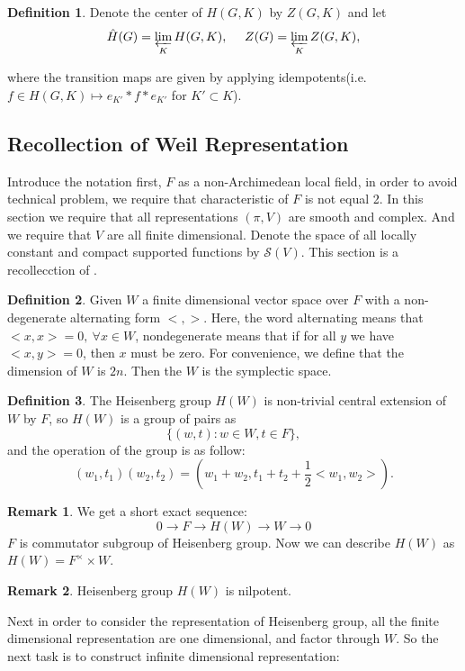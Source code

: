 \documentclass[12pt,a4paper,english]{article}
\theoremstyle{plain}
\theoremstyle{definition}
\newtheorem{defi}{Definition}
\newtheorem*{rem}{Remark}
\begin{document}
 \begin{defi}
 Denote the center of $H(G, K)$ by $Z(G, K)$ and let 
 \begin{equation*}
     \hat{H}(G)=\varprojlim_{K} H(G, K),\ \ \ \ Z(G)=\varprojlim_{K} Z(G, K),
 \end{equation*}
 \end{defi}
 where the transition maps are given by applying idempotents(i.e.  $f\in H(G, K)\mapsto e_{K'}*f*e_{K'}$ for $K'\subset K$). 
\subsection{Recollection of Weil Representation}
Introduce the notation first, $F$ as a non-Archimedean local field, in order to avoid technical problem, we require that characteristic of $F$ is not equal 2. In this section we require that all representations $(\pi, V)$ are smooth and complex. And we require that $V$ are all finite dimensional. Denote the space of all locally constant and compact supported functions by $\mathcal{S}(V)$. This section is a recollecction of \cite{kudla1996notes}.

\begin{defi}
Given $W$ a finite dimensional vector space over $F$ with a non-degenerate alternating form $<, >$. Here, the word alternating means that $<x,x>=0,\ \forall x\in W$, nondegenerate means that if for all $y$ we have $<x, y>=0$, then $x$ must be zero. For convenience, we define that the dimension of $W$ is $2n$. Then the $W$ is the symplectic space.
\end{defi}
\begin{defi}
The Heisenberg group $H(W)$ is non-trivial central extension of $W$ by $F$, so $H(W)$ is a group of pairs as
\begin{equation*}
    \big\{ (w,t): w\in W, t\in F \big\},
\end{equation*}
and the operation of the group is as follow:
\begin{equation*}
    (w_{1},t_{1})(w_{2},t_{2})=(w_{1}+w_{2},t_{1}+t_{2}+\frac{1}{2}<w_{1},w_{2}>).
\end{equation*}
\end{defi}
\begin{rem}
We get a short exact sequence:
\begin{equation*}
   0\rightarrow F\rightarrow H(W)\rightarrow W\rightarrow 0 
\end{equation*}
$F$ is commutator subgroup of Heisenberg group. Now we can describe $H(W)$ as $H(W)= F^{\times}\times W$. 
\end{rem} 
\begin{rem}
Heisenberg group $H(W)$ is nilpotent.
\end{rem}
Next in order to consider the representation of Heisenberg group, all the finite dimensional representation are one dimensional, and factor through $W$. So the next task is to construct infinite dimensional representation:
\end{document}

